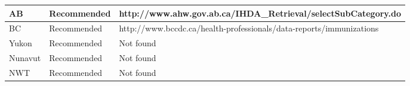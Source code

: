 \documentclass[12pt,a4paper]{article}
\begin{document}
\begin{table}
\begin{tabular}{lp{3cm}p{10cm}}
AB       & Recommended               & http://www.ahw.gov.ab.ca/IHDA\_Retrieval/selectSubCategory.do                                                                                                                       \\ \hline
BC       & Recommended               & http://www.bccdc.ca/health-professionals/data-reports/immunizations                                                                                                                 \\ \hline
Yukon    & Recommended               & Not found                                                                                                                                                                           \\ \hline
Nunavut  & Recommended               & Not found                                                                                                                                                                           \\ \hline
NWT      & Recommended               & Not found
\end{tabular}
\end{table}
\end{document}
